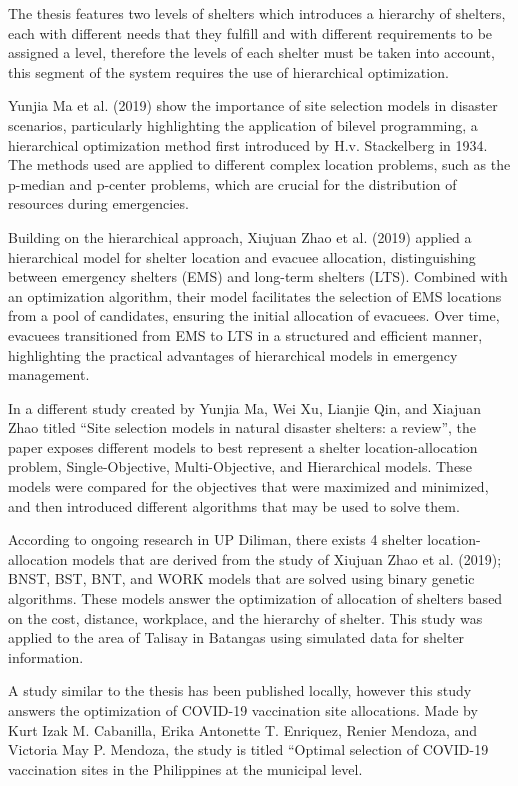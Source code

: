 The thesis features two levels of shelters which introduces a hierarchy of shelters, each with different needs that they fulfill and with different requirements to be assigned a level, therefore the levels of each shelter must be taken into account, this segment of the system requires the use of hierarchical optimization.

Yunjia Ma et al. (2019) show the importance of site selection models in disaster scenarios, particularly highlighting the application of bilevel programming, a hierarchical optimization method first introduced by H.v. Stackelberg in 1934. The methods used are applied to different complex location problems, such as the p-median and p-center problems, which are crucial for the distribution of resources during emergencies. \parencite{Yunjia2019}

Building on the hierarchical approach, Xiujuan Zhao et al. (2019) applied a hierarchical model for shelter location and evacuee allocation, distinguishing between emergency shelters (EMS) and long-term shelters (LTS). Combined with an optimization algorithm, their model facilitates the selection of EMS locations from a pool of candidates, ensuring the initial allocation of evacuees. Over time, evacuees transitioned from EMS to LTS in a structured and efficient manner, highlighting the practical advantages of hierarchical models in emergency management. \parencite{Xiujuan2019}

In a different study created by Yunjia Ma, Wei Xu, Lianjie Qin, and Xiajuan Zhao titled “Site selection models in natural disaster shelters: a review”, the paper exposes different models to best represent a shelter location-allocation problem, Single-Objective, Multi-Objective, and Hierarchical models. These models were compared for the objectives that were maximized and minimized, and then introduced different algorithms that may be used to solve them. \parencite{Yunjia2019}

According to ongoing research in UP Diliman, there exists 4 shelter location-allocation models that are derived from the study of Xiujuan Zhao et al. (2019); BNST, BST, BNT, and WORK models that are solved using binary genetic algorithms. These models answer the optimization of allocation of shelters based on the cost, distance, workplace, and the hierarchy of shelter. This study was applied to the area of Talisay in Batangas using simulated data for shelter information. \parencite{Xiujuan2019}

A study similar to the thesis has been published locally, however this study answers the optimization of COVID-19 vaccination site allocations. Made by Kurt Izak M. Cabanilla, Erika Antonette T. Enriquez, Renier Mendoza, and Victoria May P. Mendoza, the study is titled “Optimal selection of COVID-19 vaccination sites in the Philippines at the municipal level. \parencite{Kurt2021}

